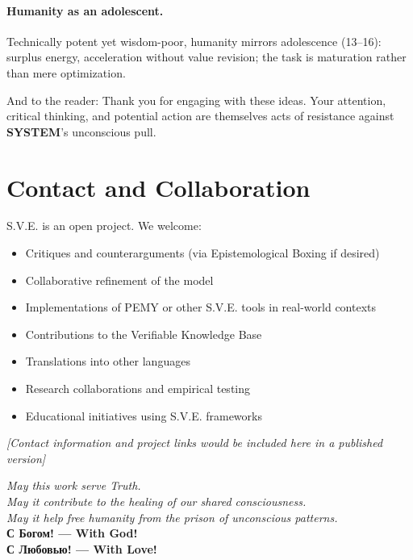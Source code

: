 \documentclass[11pt,a4paper]{article}
\newcommand{\SYSTEM}{\textbf{SYSTEM}}
\theoremstyle{definition}
\theoremstyle{remark}
\begin{document}
\paragraph{Humanity as an adolescent.}
Technically potent yet wisdom-poor, humanity mirrors adolescence (13--16): surplus energy, acceleration without value revision; the task is maturation rather than mere optimization.

\vspace{1em}

And to the reader: Thank you for engaging with these ideas. Your attention, critical thinking, and potential action are themselves acts of resistance against \SYSTEM{}'s unconscious pull.

\section*{Contact and Collaboration}

S.V.E. is an open project. We welcome:
\begin{itemize}
\item Critiques and counterarguments (via Epistemological Boxing if desired)
\item Collaborative refinement of the model
\item Implementations of PEMY or other S.V.E. tools in real-world contexts
\item Contributions to the Verifiable Knowledge Base
\item Translations into other languages
\item Research collaborations and empirical testing
\item Educational initiatives using S.V.E. frameworks
\end{itemize}

\textit{[Contact information and project links would be included here in a published version]}

\vspace{2cm}

\begin{center}
\textit{May this work serve Truth.} \\
\textit{May it contribute to the healing of our shared consciousness.} \\
\textit{May it help free humanity from the prison of unconscious patterns.} \\[0.5cm]

\textbf{С Богом! --- With God!} \\
\textbf{С Любовью! --- With Love!}
\end{center}
\end{document}
